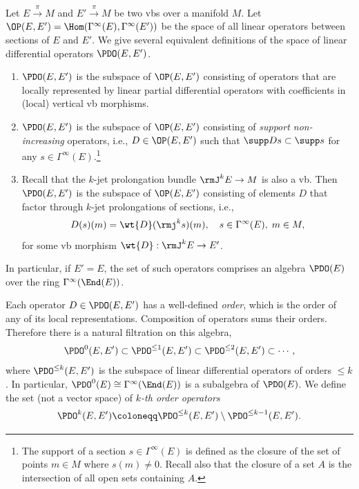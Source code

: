 \begin{defn}
    Let $E\overset{\pi}{\to}M$ and $E'\overset{\pi}{\to}M$ be two \glspl{vb} over a manifold $M$. Let $\OP(E,E')=\Hom(\Gamma^\infty(E), \Gamma^\infty(E'))$ be the space of all linear operators between sections of $E$ and $E'$. We give several equivalent definitions of the space of linear differential operators $\PDO(E,E')$.
    \begin{enumerate}
        \item $\PDO(E,E')$ is the subspace of $\OP(E,E')$ consisting of operators that are locally represented by linear partial differential operators with coefficients in (local) vertical \gls{vb} morphisms.
        \item $\PDO(E,E')$ is the subspace of $\OP(E,E')$ consisting of \emph{support non-increasing} operators, i.e., $D\in\OP(E,E')$ such that $\supp Ds\subset \supp s$ for any $s\in\Gamma^\infty(E)$.\footnote{The support of a section $s\in\Gamma^\infty(E)$ is defined as the closure of the set of points $m\in M$ where $s(m)\neq 0$. Recall also that the closure of a set $A$ is the intersection of all open sets containing $A$.}
        \item Recall that the $k$-jet prolongation bundle $\rmJ^k E\to M$ is also a \gls{vb}. Then $\PDO(E,E')$ is the subspace of $\OP(E,E')$ consisting of elements $D$ that factor through $k$-jet prolongations of sections, i.e.,
        \[D(s)(m)=\wt{D}(\rmj^ks)(m),\quad s\in \Gamma^\infty(E),\; m\in M,\]
        for some \gls{vb} morphism $\wt{D}:\rmJ^kE\to E'$.
    \end{enumerate}
\end{defn}
\begin{defn}
    In particular, if $E'=E$, the set of such operators comprises an algebra $\PDO(E)$ over the ring $\Gamma^\infty(\End(E))$.
    
    Each operator $D\in\PDO(E,E')$ has a well-defined \emph{order}, which is the order of any of its local representations. Composition of operators sums their orders. Therefore there is a natural filtration on this algebra, 
    \[\PDO^0(E,E')\subset \PDO^{\leq 1}(E,E')\subset\PDO^{\leq 2}(E,E')\subset\cdots,\] 
    where $\PDO^{\leq k}(E,E')$ is the subspace of linear differential operators of orders $\leq k$. In particular, $\PDO^0(E)\cong \Gamma^\infty(\End(E))$ is a subalgebra of $\PDO(E)$. We define the set (not a vector space) of \emph{$k$-th order operators}
    \[\PDO^k(E,E')\coloneqq \PDO^{\leq k}(E,E')\setminus \PDO^{\leq k-1}(E,E').\]
\end{defn}

